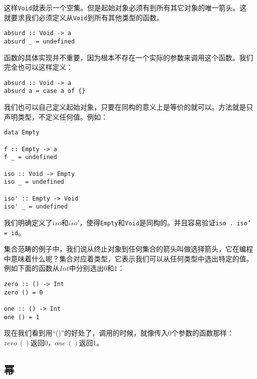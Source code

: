 \documentclass{article}
\begin{document}
\begin{example}
这样\texttt{Void}就表示一个空集。但是起始对象必须有到所有其它对象的唯一箭头。这就要求我们必须定义从\texttt{Void}到所有其他类型的函数。

\begin{lstlisting}
absurd :: Void -> a
absurd _ = undefined
\end{lstlisting}

函数的具体实现并不重要，因为根本不存在一个实际的参数来调用这个函数。我们完全也可以这样定义：

\begin{lstlisting}
absurd :: Void -> a
absurd a = case a of {}
\end{lstlisting}

我们也可以自己定义起始对象，只要在同构的意义上是等价的就可以。方法就是只声明类型，不定义任何值。例如：

\begin{lstlisting}
data Empty

f :: Empty -> a
f _ = undefined

iso :: Void -> Empty
iso _ = undefined

iso' :: Empty -> Void
iso' _ = undefined
\end{lstlisting}

我们明确定义了$iso$和$iso'$，使得\texttt{Empty}和$\texttt{Void}$是同构的。并且容易验证\texttt{iso . iso' = id}。

集合范畴的例子中，我们说从终止对象到任何集合的箭头叫做选择箭头，它在编程中意味着什么呢？集合对应着类型，它表示我们可以从任何类型中选出特定的值。例如下面的函数从$Int$中分别选出0和1：

\begin{lstlisting}
zero :: () -> Int
zero () = 0

one :: () -> Int
one () = 1
\end{lstlisting}

现在我们看到用“()”的好处了，调用的时候，就像传入0个参数的函数那样：$zero\ ()$返回0，$one\ ()$返回1。
\end{example}

\begin{Exercise}
\end{Exercise}

\subsection{幂}
 
\end{document}
